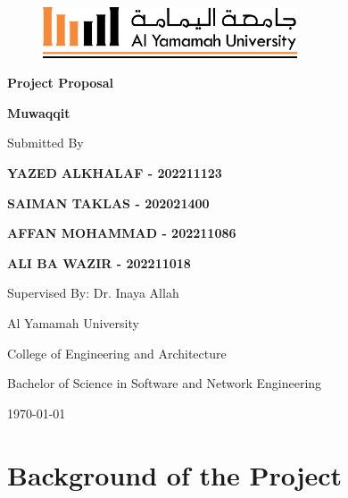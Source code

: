 \documentclass[12pt,a4paper]{article}
\begin{document}
\begin{titlepage}
    \begin{figure}[ht!]
        \centering
        \includegraphics[height=1.5cm]{images/yu-logo.png}
    \end{figure}

    \begin{center}
        \vspace*{2cm}
        {\huge\bfseries Project Proposal\par}
        \vspace{1.5cm}
        {\Large\bfseries Muwaqqit\par}
        \vspace{2cm}
        {\Large Submitted By\par}
        \vspace{1cm}
        {\Large\bfseries YAZED ALKHALAF - 202211123\par}
        {\Large\bfseries SAIMAN TAKLAS - 202021400\par}
        {\Large\bfseries AFFAN MOHAMMAD - 202211086\par}
        {\Large\bfseries ALI BA WAZIR - 202211018\par}
        \vfill
        {\Large Supervised By: Dr. Inaya Allah\par}
        \vspace{1cm}
        {\Large Al Yamamah University\par}
        {\Large College of Engineering and Architecture\par}
        {\Large Bachelor of Science in Software and Network Engineering\par}
        \vspace{1cm}
        {\Large \today\par}
    \end{center}
\end{titlepage}

\tableofcontents
\clearpage

\doublespacing

\section{Background of the Project}
\end{document}
